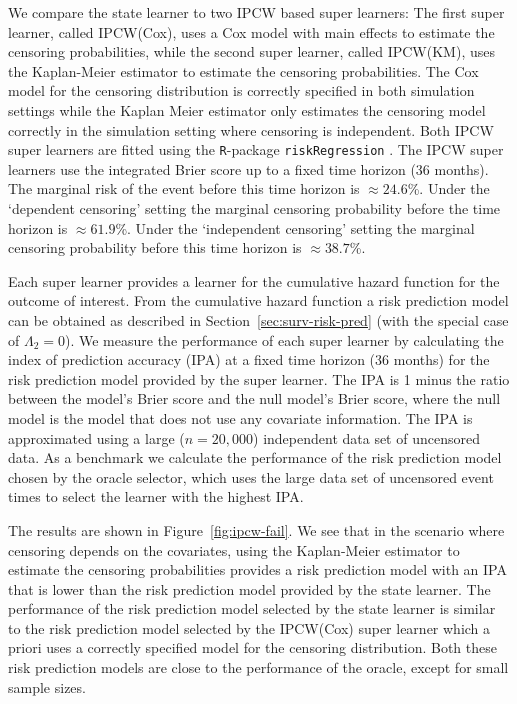 \documentclass[a4paper,danish]{article}
\theoremstyle{plain} %
\numberwithin{theorem}{section}
\theoremstyle{definition} %
\theoremstyle{remark}
\newcommand{\1}{\mathds{1}}
\begin{document}
We compare the state learner to two IPCW based super learners: The
first super learner, called IPCW(Cox), uses a Cox model with main
effects to estimate the censoring probabilities, while the second
super learner, called IPCW(KM), uses the Kaplan-Meier estimator to
estimate the censoring probabilities. The Cox model for the censoring
distribution is correctly specified in both simulation settings while
the Kaplan Meier estimator only estimates the censoring model
correctly in the simulation setting where censoring is
independent. Both IPCW super learners are fitted using the
\texttt{R}-package \texttt{riskRegression}
\citep{Gerds_Ohlendorff_Ozenne_2023}.
%
%
The IPCW super learners use the integrated Brier score up to a fixed time
horizon (36 months). The marginal risk of the event before this time horizon is
\(\approx 24.6\)\%. Under the `dependent censoring' setting the marginal
censoring probability before the time horizon is \(\approx 61.9\)\%. Under the
`independent censoring' setting the marginal censoring probability before this
time horizon is \( \approx 38.7 \)\%.

Each super learner provides a learner for the cumulative
hazard function for the outcome of interest. From the
cumulative hazard function a risk prediction model can be
obtained as described in Section~\ref{sec:surv-risk-pred}
(with the special case of $\Lambda_2 = 0$). We measure the
performance of each super learner by calculating the index of
prediction accuracy (IPA) \citep{kattan2018index} at a fixed
time horizon (36 months) for the risk prediction model
provided by the super learner. The IPA is 1 minus the ratio
between the model's Brier score and the null model's Brier
score, where the null model is the model that does not use any
covariate information. The IPA is approximated using a large
(\( n = 20,000 \)) independent data set of uncensored data. As
a benchmark we calculate the performance of the risk
prediction model chosen by the oracle selector, which uses the
large data set of uncensored event times to select the learner
with the highest IPA.

The results are shown in Figure~\ref{fig:ipcw-fail}. We see that in
the scenario where censoring depends on the covariates, using the
Kaplan-Meier estimator to estimate the censoring probabilities
provides a risk prediction model with an IPA that is lower than the
risk prediction model provided by the state learner. The performance
of the risk prediction model selected by the state learner is similar
to the risk prediction model selected by the IPCW(Cox) super learner
which a priori uses a correctly specified model for the censoring
distribution. Both these risk prediction models are close to the
performance of the oracle, except for small sample sizes.
\end{document}
